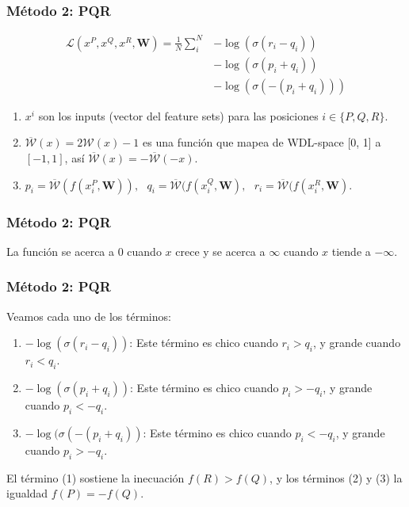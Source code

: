 \begin{frame}
\frametitle{Método 2: PQR}
\begin{align*}
\mathcal{L}(x^P, x^Q, x^R, \bm{W})=
\frac{1}{N}
\sum_i^N
& -\log\left(\sigma(r_i - q_i)\right) \\
& -\log\left(\sigma(p_i + q_i)\right) \\
& -\log\left(\sigma(-(p_i + q_i))\right)
\end{align*}
\begin{enumerate}
\itemsep0em
\item $x^i$ son los inputs (vector del feature sets) para las posiciones $i \in \{P,Q,R\}$.
\item $\overline{\mathcal{W}}(x) = 2 \mathcal{W}(x) - 1$ es una función que mapea de WDL-space [0, 1] a $[-1, 1]$, así $\overline{\mathcal{W}}(x) = -\overline{\mathcal{W}}(-x)$.
\item $
p_i = \overline{\mathcal{W}}(f(x^P_i, \bm{W})),\text{ }
q_i = \overline{\mathcal{W}}(f(x^Q_i, \bm{W}),\text{ }
r_i = \overline{\mathcal{W}}(f(x^R_i, \bm{W})
$.
\end{enumerate}
\end{frame}


\begin{frame}
\frametitle{Método 2: PQR}
\begin{figure}[H]
\centering
{}
\end{figure}
La función se acerca a 0 cuando $x$ crece y se acerca a $\infty$ cuando $x$ tiende a $-\infty$.
\end{frame}

\begin{frame}
\frametitle{Método 2: PQR}
Veamos cada uno de los términos:
\begin{enumerate}
\itemsep0em
\item $-\log(\sigma(r_i - q_i))$: Este término es chico cuando $r_i > q_i$, y grande cuando $r_i < q_i$.
\item $-\log(\sigma(p_i + q_i))$: Este término es chico cuando $p_i > -q_i$, y grande cuando $p_i < -q_i$.
\item $-\log(\sigma(-(p_i + q_i))$: Este término es chico cuando $p_i < -q_i$, y grande cuando $p_i > -q_i$.
\end{enumerate}

El término (1) sostiene la inecuación $f(R) > f(Q)$, y los términos (2) y (3) la igualdad $f(P) = -f(Q)$.
\end{frame}
